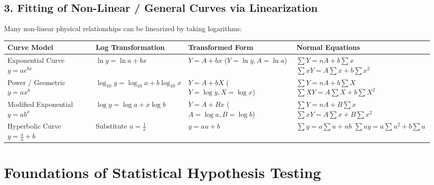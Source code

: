 \documentclass[12pt,a4paper]{article}
\begin{document}
\subsection{3. Fitting of Non-Linear / General Curves via Linearization}
Many non-linear physical relationships can be linearized by taking logarithms:
\par\vspace{6pt}
\begingroup
\setlength{\tabcolsep}{5pt}
\setlength{\extrarowheight}{3pt}
\noindent\begin{tabularx}{\linewidth}{|B{3.2cm}|B{3.5cm}|B{3.2cm}|Y|}
\hline
\textbf{Curve Model} & \textbf{Log Transformation} & \textbf{Transformed Form} & \textbf{Normal Equations} \\
\hline
Exponential Curve \newline $y = a e^{bx}$ & $\ln y = \ln a + bx$ & $Y = A + bx$ \newline ($Y = \ln y, A = \ln a$) & $\sum Y = n A + b \sum x$ \newline $\sum x Y = A \sum x + b \sum x^2$ \\
\hline
Power / Geometric \newline $y = a x^b$ & $\log_{10} y = \log_{10} a + b \log_{10} x$ & $Y = A + b X$ \newline ($Y=\log y, X=\log x$) & $\sum Y = n A + b \sum X$ \newline $\sum X Y = A \sum X + b \sum X^2$ \\
\hline
Modified Exponential \newline $y = a b^x$ & $\log y = \log a + x \log b$ & $Y = A + B x$ \newline ($A=\log a, B=\log b$) & $\sum Y = n A + B \sum x$ \newline $\sum x Y = A \sum x + B \sum x^2$ \\
\hline
Hyperbolic Curve \newline $y = \frac{a}{x} + b$ & Substitute $u = \frac{1}{x}$ & $y = a u + b$ & $\sum y = a \sum u + n b$ \newline $\sum u y = a \sum u^2 + b \sum u$ \\
\hline
\end{tabularx}\par
\endgroup
\vspace{12pt}

\section{Foundations of Statistical Hypothesis Testing}
\end{document}
